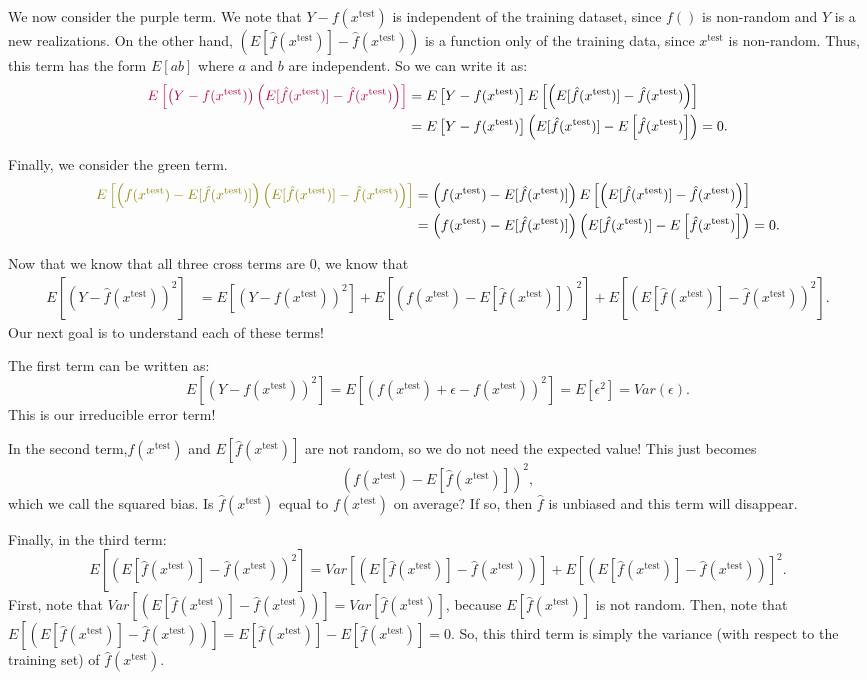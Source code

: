 \documentclass[titlepage,10pt]{scrartcl}
\newcommand{\xte}{x^{\mathrm{test}}}
\begin{document}
We now consider the purple term. We note that $Y-f(\xte)$ is independent of the training dataset, since $f()$ is non-random and $Y$ is a new realizations. On the other hand, $\left(E[\hat{f}(\xte)] -  \hat{f}(\xte)\right)$ is a function only of the training data, since $\xte$ is non-random. Thus, this term has the form $E[ab]$ where $a$ and $b$ are independent. So we can write it as: 
\begin{align*}
 \textcolor{purple}{E\left[\left(Y -f(\xte)\right) \left(E[\hat{f}(\xte)] -  \hat{f}(\xte)\right)\right]} &= 	E\left[ Y -f(\xte)\right] E\left[\left(E[\hat{f}(\xte)] -  \hat{f}(\xte)\right)\right] \\
 &= E\left[ Y -f(\xte)\right] \left(E[\hat{f}(\xte)] -   E\left[\hat{f}(\xte)\right] \right) = 0. \\
\end{align*}

Finally, we consider the green term. 
\begin{align*}
\textcolor{olive}{E\left[\left(f(\xte) - E[\hat{f}(\xte)]\right) \left(E[\hat{f}(\xte)] -  \hat{f}(\xte)\right)\right]} &= \left(f(\xte) - E[\hat{f}(\xte)]\right) E\left[ \left(E[\hat{f}(\xte)] -  \hat{f}(\xte)\right)\right] \\
&= \left(f(\xte) - E[\hat{f}(\xte)]\right) \left(E[\hat{f}(\xte)] -   E\left[ \hat{f}(\xte) \right]\right) = 0. 
\end{align*}

Now that we know that all three cross terms are $0$, we know that 
\begin{align*}
 E\left[\left(Y - \hat{f}(\xte)\right)^2 \right] &= E\left[\left(Y -f(\xte)\right)^2\right] + E\left[\left(f(\xte) - E[\hat{f}(\xte)]\right)^2\right] + E\left[\left(E[\hat{f}(\xte)] -  \hat{f}(\xte)\right)^2\right]. 
\end{align*}
Our next goal is to understand each of these terms! 

The first term can be written as:
$$
E\left[\left(Y -f(\xte)\right)^2\right] = E\left[\left(f(\xte)+\epsilon -f(\xte)\right)^2\right] = E\left[\epsilon^2\right] = Var(\epsilon).  
$$
This is our irreducible error term! 

In the second term,$f(\xte)$ and $E[\hat{f}(\xte)]$ are not random, so we do not need the expected value! This just becomes
$$
\left(f(\xte) - E[\hat{f}(\xte)]\right)^2,
$$
which we call the squared bias. Is $\hat{f}(\xte)$ equal to $f(\xte)$ on average? If so, then $\hat{f}$ is unbiased and this term will disappear. 

Finally, in the third term: 
$$
 E\left[\left(E[\hat{f}(\xte)] -  \hat{f}(\xte)\right)^2\right] =  Var\left[\left(E[\hat{f}(\xte)] -  \hat{f}(\xte)\right)\right]  + E\left[\left(E[\hat{f}(\xte)] -  \hat{f}(\xte)\right)\right]^2.
$$
First, note that $Var\left[\left(E[\hat{f}(\xte)] -  \hat{f}(\xte)\right)\right] = Var\left[\hat{f}(\xte)\right]$, because $E[\hat{f}(\xte)]$ is not random. Then, note that $E\left[\left(E[\hat{f}(\xte)] -  \hat{f}(\xte)\right)\right] = E[\hat{f}(\xte)] -  E\left[\hat{f}(\xte)\right] = 0$. So, this third term is simply the variance (with respect to the training set) of $\hat{f}(\xte)$. 
\end{document}
